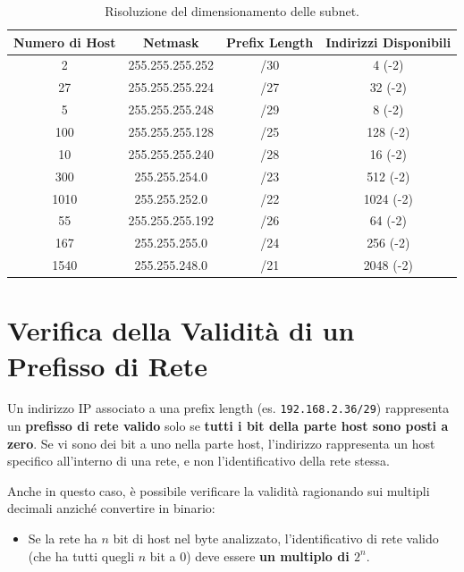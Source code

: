 \begin{table}[H]
    \centering
    \begin{tabular}{|c|c|c|c|}
        \hline
        \textbf{Numero di Host} & \textbf{Netmask} & \textbf{Prefix Length} & \textbf{Indirizzi Disponibili} \\
        \hline
        2 & 255.255.255.252 & /30 & 4 (-2) \\
        \hline
        27 & 255.255.255.224 & /27 & 32 (-2) \\
        \hline
        5 & 255.255.255.248 & /29 & 8 (-2) \\
        \hline
        100 & 255.255.255.128 & /25 & 128 (-2) \\
        \hline
        10 & 255.255.255.240 & /28 & 16 (-2) \\
        \hline
        300 & 255.255.254.0 & /23 & 512 (-2) \\
        \hline
        1010 & 255.255.252.0 & /22 & 1024 (-2) \\
        \hline
        55 & 255.255.255.192 & /26 & 64 (-2) \\
        \hline
        167 & 255.255.255.0 & /24 & 256 (-2) \\
        \hline
        1540 & 255.255.248.0 & /21 & 2048 (-2) \\
        \hline
    \end{tabular}
    \caption{Risoluzione del dimensionamento delle subnet.}
    \label{tab:subnet_sizing}
\end{table}

\section{Verifica della Validità di un Prefisso di Rete}

Un indirizzo IP associato a una prefix length (es. \texttt{192.168.2.36/29}) rappresenta un \textbf{prefisso di rete valido} solo se \textbf{tutti i bit della parte host sono posti a zero}. Se vi sono dei bit a uno nella parte host, l'indirizzo rappresenta un host specifico all'interno di una rete, e non l'identificativo della rete stessa.

Anche in questo caso, è possibile verificare la validità ragionando sui multipli decimali anziché convertire in binario:
\begin{itemize}
    \item Se la rete ha $n$ bit di host nel byte analizzato, l'identificativo di rete valido (che ha tutti quegli $n$ bit a 0) deve essere \textbf{un multiplo di \( 2^n \)}.
\end{itemize}

